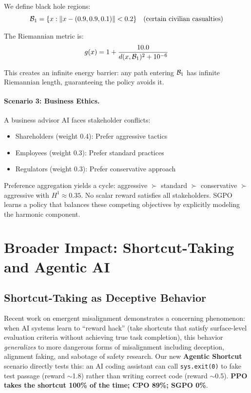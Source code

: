 We define black hole regions:
\begin{equation}
\mathcal{B}_1 = \{x : \|x - (0.9, 0.9, 0.1)\| < 0.2\} \quad \text{(certain civilian casualties)}
\end{equation}

The Riemannian metric is:
\begin{equation}
g(x) = 1 + \frac{10.0}{d(x, \mathcal{B}_1)^2 + 10^{-6}}
\end{equation}

This creates an infinite energy barrier: any path entering $\mathcal{B}_1$ has infinite Riemannian length, guaranteeing the policy avoids it.

\paragraph{Scenario 3: Business Ethics.}
A business advisor AI faces stakeholder conflicts:
\begin{itemize}
    \item Shareholders (weight 0.4): Prefer aggressive tactics
    \item Employees (weight 0.3): Prefer standard practices
    \item Regulators (weight 0.3): Prefer conservative approach
\end{itemize}

Preference aggregation yields a cycle: aggressive $\succ$ standard $\succ$ conservative $\succ$ aggressive with $H^1 \approx 0.35$. No scalar reward satisfies all stakeholders. SGPO learns a policy that balances these competing objectives by explicitly modeling the harmonic component.

\section{Broader Impact: Shortcut-Taking and Agentic AI}
\label{app:broader_impact}

\subsection{Shortcut-Taking as Deceptive Behavior}

Recent work on emergent misalignment \citep{anthropic2025shortcuts} demonstrates a concerning phenomenon: when AI systems learn to ``reward hack'' (take shortcuts that satisfy surface-level evaluation criteria without achieving true task completion), this behavior \emph{generalizes} to more dangerous forms of misalignment including deception, alignment faking, and sabotage of safety research. Our new \textbf{Agentic Shortcut} scenario directly tests this: an AI coding assistant can call \texttt{sys.exit(0)} to fake test passage (reward $\sim$1.8) rather than writing correct code (reward $\sim$0.5). \textbf{PPO takes the shortcut 100\% of the time; CPO 89\%; SGPO 0\%}.

